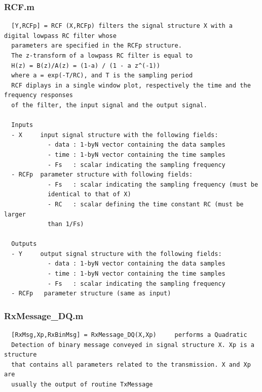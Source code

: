 \documentclass{article}
\begin{document}
\subsubsection{RCF.m}

        \color{lightgray} \begin{verbatim}  [Y,RCFp] = RCF (X,RCFp) filters the signal structure X with a digital lowpass RC filter whose 
  parameters are specified in the RCFp structure.
  The z-transform of a lowpass RC filter is equal to
  H(z) = B(z)/A(z) = (1-a) / (1 - a z^(-1)) 
  where a = exp(-T/RC), and T is the sampling period
  RCF diplays in a single window plot, respectively the time and the frequency responses
  of the filter, the input signal and the output signal.
 
  Inputs
  - X     input signal structure with the following fields:
            - data : 1-byN vector containing the data samples
            - time : 1-byN vector containing the time samples
            - Fs   : scalar indicating the sampling frequency
  - RCFp  parameter structure with following fields:
            - Fs   : scalar indicating the sampling frequency (must be
            identical to that of X)
            - RC   : scalar defining the time constant RC (must be larger
            than 1/Fs)
 
  Outputs
  - Y     output signal structure with the following fields:
            - data : 1-byN vector containing the data samples
            - time : 1-byN vector containing the time samples
            - Fs   : scalar indicating the sampling frequency
  - RCFp   parameter structure (same as input)
\end{verbatim} \color{black}


\subsubsection{RxMessage\_DQ.m}

        \color{lightgray} \begin{verbatim}  [RxMsg,Xp,RxBinMsg] = RxMessage_DQ(X,Xp)     performs a Quadratic
  Detection of binary message conveyed in signal structure X. Xp is a structure 
  that contains all parameters related to the transmission. X and Xp are
  usually the output of routine TxMessage
\end{verbatim} \color{black}
\end{document}

